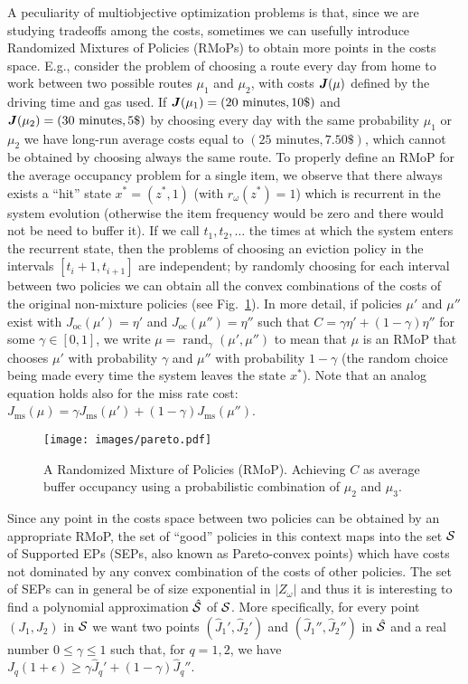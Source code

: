 \documentclass[11pt,a4paper]{article}
\DeclareMathOperator{\rand}{rand}
\DeclareMathOperator{\oc}{oc}
\DeclareMathOperator{\ms}{ms}
\theoremstyle{definition}
\theoremstyle{remark}
\def\vec#1{\mathchoice{\mbox{\boldmath$\displaystyle#1$}}
  {\mbox{\boldmath$\textstyle#1$}}
  {\mbox{\boldmath$\scriptstyle#1$}}
  {\mbox{\boldmath$\scriptscriptstyle#1$}}}
\begin{document}
A peculiarity of multiobjective optimization problems is that, since we are
studying tradeoffs among the costs, sometimes we can usefully introduce
Randomized Mixtures of Policies (RMoPs) to obtain more points in the costs
space. E.g., consider the problem of choosing a route every day from home to
work between two possible routes $\mu_1$ and $\mu_2$, with costs $\vec J(\mu)$
defined by the driving time and gas used. If $\vec J(\mu_1)=(20 \text{
  minutes},10 \$)$ and $\vec J(\mu_2)=(30 \text{ minutes}, 5 \$)$ by choosing
every day with the same probability $\mu_1$ or $\mu_2$ we have long-run average
costs equal to $(25 \text{ minutes}, 7.50 \$)$, which cannot be obtained by
choosing always the same route. To properly define an RMoP for the average
occupancy problem for a single item, we observe that there always exists a
``hit'' state $x^*=(z^*,1)$ (with $r_\omega(z^*)=1$) which is recurrent in the
system evolution (otherwise the item frequency would be zero and there would not
be need to buffer it). If we call $t_1, t_2, \ldots$ the times at which the
system enters the recurrent state, then the problems of choosing an eviction
policy in the intervals $[t_i+1, t_{i+1}]$ are independent; by randomly choosing
for each interval between two policies we can obtain all the convex combinations
of the costs of the original non-mixture policies (see Fig.~\ref{fig:pareto}).
In more detail, if policies $\mu'$ and $\mu''$ exist with $J_{\oc}(\mu')=\eta'$
and $J_{\oc}(\mu'')=\eta''$ such that $C = \gamma \eta' + (1-\gamma) \eta''$ for
some $\gamma \in [0,1]$, we write $\mu = \rand_\gamma\left(\mu', \mu''\right)$
to mean that $\mu$ is an RMoP that chooses $\mu'$ with probability $\gamma$ and
$\mu''$ with probability $1-\gamma$ (the random choice being made every time the
system leaves the state $x^*$). Note that an analog equation holds also for the
miss rate cost: $J_{\ms}(\mu)=\gamma J_{\ms}(\mu') + (1-\gamma) J_{\ms}(\mu'')$.

\begin{figure}
  \centering
  \texttt{[image: images/pareto.pdf]}
  \caption{A Randomized Mixture of Policies (RMoP). Achieving $C$ as average
    buffer occupancy using a probabilistic combination of $\mu_2$ and $\mu_3$.}
  \label{fig:pareto}
\end{figure}

Since any point in the costs space between two policies can be obtained by an
appropriate RMoP, the set of ``good'' policies in this context maps into the set
$\cal{S}$ of Supported EPs (SEPs, also known as Pareto-convex points) which have
costs not dominated by any convex combination of the costs of other
policies. The set of SEPs can in general be of size exponential in $|Z_\omega|$
and thus it is interesting to find a polynomial approximation $\hat{\cal{S}}$ of
$\cal{S}$. More specifically, for every point $(J_1,J_2)$ in $\cal{S}$ we want
two points $({\hat J}_1', {\hat J}_2')$ and $({\hat J}_1'', {\hat J}_2'')$ in
$\hat{\cal{S}}$ and a real number $0 \leq \gamma \leq 1$ such that, for $q=1,2$,
we have $J_q (1+\epsilon) \geq \gamma {\hat J}_q' + (1 - \gamma) {\hat J}_q''$.
\end{document}
